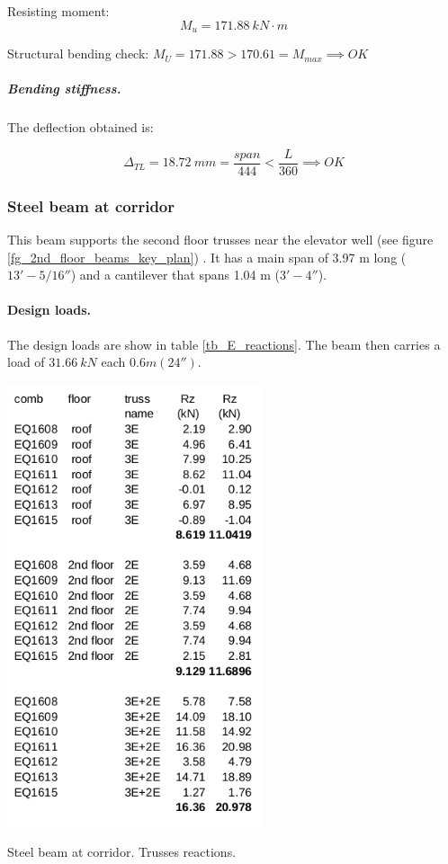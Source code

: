 \noindent Resisting moment:
\begin{equation}
  M_u= 171.88\ kN\cdot m
\end{equation}

\noindent Structural bending check: $M_U = 171.88 > 170.61 = M_{max} \implies OK$

\subparagraph{Bending stiffness.}
The deflection obtained is:

\begin{equation}
  \Delta_{TL}= 18.72\ mm= \frac{span}{444} < \frac{L}{360} \implies OK
\end{equation}

\subsubsection{Steel beam at corridor}
This beam supports the second floor trusses near the elevator well (see figure \ref{fg_2nd_floor_beams_key_plan}) . It has a main span of 3.97 m long ($13' - 5/16''$)  and a cantilever that spans 1.04 m ($3'-4''$).

\paragraph{Design loads.}
The design loads are show in table \ref{tb_E_reactions}. The beam then carries a load of $31.66\ kN$ each $0.6 m (24'')$. 

\begin{table}
  \begin{center}
  \includegraphics[width=75mm]{figures/E_reactions}
  \end{center}
  \caption{Steel beam at corridor. Trusses reactions.}\label{tb_E_reactions}
\end{table}

